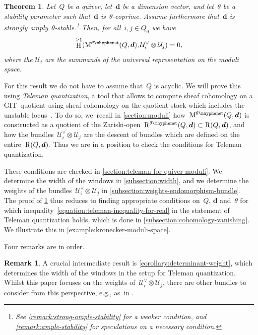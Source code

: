 \documentclass[11pt]{article}
\theoremstyle{plain}
\newtheorem{alphatheorem}{Theorem}
\theoremstyle{definition}
\newtheorem{remark}[theorem]{Remark}
\DeclareMathOperator\HH{H}
\newcommand\dash{\nobreakdash-\hspace{0pt}}
\newcommand\moduli{\ensuremath{\mathrm{M}}}
\newcommand\stable{\ensuremath{\mhyphen\mathrm{st}}}
\newcommand\tuple[1]{\ensuremath{{\boldsymbol{#1}}}}
\begin{document}
\begin{alphatheorem}
\label{theorem:cohomology-vanishing}
Let~$Q$ be a quiver,
let~$\tuple{d}$ be a dimension vector,
and let~$\theta$ be a stability parameter
such that~$\tuple{d}$ is~$\theta$\dash coprime.
Assume furthermore that~$\tuple{d}$ is strongly amply~$\theta$\dash stable.\footnote{See \cref{remark:strong-ample-stability} for a weaker condition,
and \cref{remark:ample-stability} for speculations on a necessary condition.}
Then, for all~$i,j \in Q_0$ we have
\begin{equation}
\label{equation:cohomology-vanishing}
\HH^{\geq1}(\moduli^{\theta\stable}(Q,\tuple{d}), \mathcal{U}^\vee_i \otimes \mathcal{U}_j) = 0,
\end{equation}
where the $\mathcal{U}_i$ are the summands of
the universal representation on the moduli space.
\end{alphatheorem}

For this result we do not have to assume that~$Q$ is acyclic.
We will prove this using \emph{Teleman quantization},
a tool that allows to compute sheaf cohomology on a GIT~quotient
using sheaf cohomology on the quotient stack which includes the unstable locus~\cite{MR1792291}.
To do so, we~recall in \cref{section:moduli}
how~$\moduli^{\theta\stable}(Q,\tuple{d})$ is constructed as a quotient
of the Zariski-open~$\repspace[\theta\stable]{Q,\tuple{d}}\subset\repspace{Q,\tuple{d}}$,
and how the bundles~$\mathcal{U}_i^\vee\otimes\mathcal{U}_j$ are the descent
of bundles which are defined on the entire~$\repspace{Q,\tuple{d}}$.
Thus we are in a position to check the conditions for Teleman quantization.

These conditions are checked in \cref{section:teleman-for-quiver-moduli}.
We determine the width of the windows in \cref{subsection:width},
and we determine the weights of the bundles~$\mathcal{U}_i^\vee\otimes\mathcal{U}_j$ in \cref{subsection:weights-endomorphism-bundle}.
The proof of \cref{theorem:cohomology-vanishing}
thus reduces to finding appropriate conditions on~$Q$, $\tuple{d}$ and~$\theta$
for which inequality~\eqref{equation:teleman-inequality-for-real} in the statement of Teleman quantization holds,
which is done in \cref{subsection:cohomology-vanishing}.
We illustrate this in \cref{example:kronecker-moduli-space}.

Four remarks are in order.

\begin{remark}
A crucial intermediate result is \cref{corollary:determinant-weight},
which determines the width of the windows in the setup for Teleman quantization.
Whilst this paper focuses on the weights of~$\mathcal{U}^\vee_i \otimes \mathcal{U}_j$,
there are other bundles to consider from this perspective,
e.g., as~in \cite{MR4894756}.
\end{remark}
\end{document}
